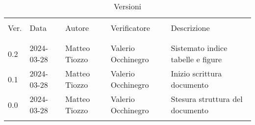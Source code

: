 \documentclass[12pt]{article} %
\begin{document}


\newpage



\begin{table}[!h]
	\footnotesize
	\begin{center}
		\caption*{Versioni}
		\vspace{0.5cm}
		\begin{tabular}{ l l l l p{6cm} }
			\hline                                                                                     \\[-2ex]
			Ver. & Data       & Autore        & Verificatore       & Descrizione                       \\
			\\[-2ex] \hline \\[-1.5ex]
			0.2  & 2024-03-28 & Matteo Tiozzo & Valerio Occhinegro & Sistemato indice tabelle e figure \\
			0.1  & 2024-03-28 & Matteo Tiozzo & Valerio Occhinegro & Inizio scrittura documento        \\
			0.0  & 2024-03-28 & Matteo Tiozzo & Valerio Occhinegro & Stesura struttura del documento   \\
			\\[-1.5ex] \hline
		\end{tabular}
	\end{center}
\end{table}

\newpage

\tableofcontents

\newpage

\listoftables

\listoffigures

\newpage




\end{document}
